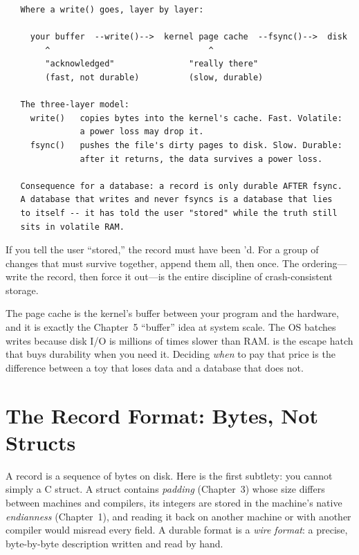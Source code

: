 \begin{verbatim}
   Where a write() goes, layer by layer:

     your buffer  --write()-->  kernel page cache  --fsync()-->  disk
        ^                                ^
        "acknowledged"               "really there"
        (fast, not durable)          (slow, durable)

   The three-layer model:
     write()   copies bytes into the kernel's cache. Fast. Volatile:
               a power loss may drop it.
     fsync()   pushes the file's dirty pages to disk. Slow. Durable:
               after it returns, the data survives a power loss.

   Consequence for a database: a record is only durable AFTER fsync.
   A database that writes and never fsyncs is a database that lies
   to itself -- it has told the user "stored" while the truth still
   sits in volatile RAM.
\end{verbatim}

\begin{ruleofthumb}
If you tell the user ``stored,'' the record must have been 'd.
For a group of changes that must survive together, append them all,
then  once. The ordering---write the record, then force it
out---is the entire discipline of crash-consistent storage.
\end{ruleofthumb}

\begin{osconcept}
The page cache is the kernel's buffer between your program and the
hardware, and it is exactly the Chapter~5 ``buffer'' idea at system
scale. The OS batches writes because disk I/O is millions of times
slower than RAM.  is the escape hatch that buys
durability when you need it. Deciding \emph{when} to pay that price is
the difference between a toy that loses data and a database that does
not.
\end{osconcept}

\section{The Record Format: Bytes, Not Structs}

A record is a sequence of bytes on disk. Here is the first subtlety:
you cannot simply  a C struct. A struct contains
\emph{padding} (Chapter~3) whose size differs between machines and
compilers, its integers are stored in the machine's native
\emph{endianness} (Chapter~1), and reading it back on another machine
or with another compiler would misread every field. A durable format
is a \emph{wire format}: a precise, byte-by-byte description written
and read by hand.

